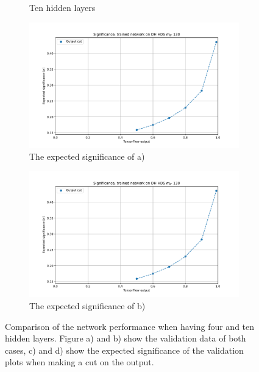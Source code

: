 \documentclass[14pt, a4paper]{book}
\begin{document}
\begin{figure}[!ht]
\begin{subfigure}[b]{0.49\textwidth}
        \caption{Ten hidden layers}
     \end{subfigure}
   \hfill\graphicspath{{../../../Plots/DeepNeuralNetwork/FULL/BEST_GRID/DH_HDS_mZp_130/}}
   \begin{subfigure}[b]{0.49\textwidth}
      \centering
      \includegraphics[width=1\textwidth]{EXP_SIG.pdf}
      \caption{The expected significance of a)}
   \end{subfigure}
   \hfill\graphicspath{{../../../Plots/DeepNeuralNetwork/FULL/10_HIDDEN_LAYERS/DH_HDS_mZp_130/}}
   \begin{subfigure}[b]{0.49\textwidth}
      \centering
      \includegraphics[width=1\textwidth]{EXP_SIG.pdf}
      \caption{The expected significance of b)}
   \end{subfigure}
     \caption{Comparison of the network performance when having four and ten hidden layers. Figure a) and b) show the validation data of both cases, c) and d) show the expected significance of the validation plots when making a cut on the output. }
\end{figure}
\end{document}
